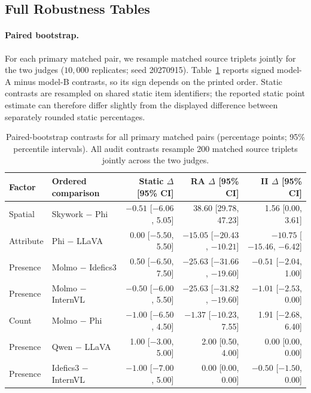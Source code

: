 \subsection{Full Robustness Tables}
\label{app:robustness-tables}

\paragraph{Paired bootstrap.}
For each primary matched pair, we resample matched source triplets jointly for
the two judges ($10{,}000$ replicates; seed 20270915). Table~\ref{tab:paired-bootstrap}
reports signed model-A minus model-B contrasts, so its sign depends on the
printed order. Static contrasts are resampled on shared static item identifiers;
the reported static point estimate can therefore differ slightly from the
displayed difference between separately rounded static percentages.

\begin{table}[t]
\centering
\scriptsize
\caption{Paired-bootstrap contrasts for all primary matched pairs (percentage
points; 95\% percentile intervals). All audit contrasts resample 200 matched
source triplets jointly across the two judges.}
\label{tab:paired-bootstrap}
\setlength{\tabcolsep}{4pt}
\begin{tabular}{llrrr}
\toprule
Factor & Ordered comparison & Static $\Delta$ [95\% CI] & RA $\Delta$ [95\% CI] & II $\Delta$ [95\% CI] \\
\midrule
Spatial & Skywork $-$ Phi & $-0.51$ [$-6.06$, 5.05] & 38.60 [29.78, 47.23] & 1.56 [0.00, 3.61] \\
Attribute & Phi $-$ LLaVA & 0.00 [$-5.50$, 5.50] & $-15.05$ [$-20.43$, $-10.21$] & $-10.75$ [$-15.46$, $-6.42$] \\
Presence & Molmo $-$ Idefics3 & 0.50 [$-6.50$, 7.50] & $-25.63$ [$-31.66$, $-19.60$] & $-0.51$ [$-2.04$, 1.00] \\
Presence & Molmo $-$ InternVL & $-0.50$ [$-6.00$, 5.50] & $-25.63$ [$-31.82$, $-19.60$] & $-1.01$ [$-2.53$, 0.00] \\
Count & Molmo $-$ Phi & $-1.00$ [$-6.50$, 4.50] & $-1.37$ [$-10.23$, 7.55] & 1.91 [$-2.68$, 6.40] \\
Presence & Qwen $-$ LLaVA & 1.00 [$-3.00$, 5.00] & 2.00 [0.50, 4.00] & 0.00 [0.00, 0.00] \\
Presence & Idefics3 $-$ InternVL & $-1.00$ [$-7.00$, 5.00] & 0.00 [0.00, 0.00] & $-0.50$ [$-1.50$, 0.00] \\
\bottomrule
\end{tabular}
\end{table}

